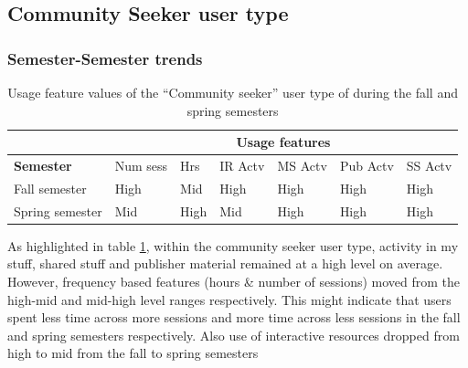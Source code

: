 \documentclass{acm_proc_article-sp}
\begin{document}
\subsection{Community Seeker user type}

\subsubsection{Semester-Semester trends}

\begin{table}
\caption{Usage feature values of the ``Community seeker'' user type of during the fall and  spring semesters}
\label{cluster2semester}
\begin{tabular}{|p{1.5cm}|p{0.6cm}|p{0.6cm}|p{0.6cm}|p{0.6cm}|p{0.8cm}|p{0.8cm}|}
\hline
& \multicolumn{6}{c|}{\textbf{Usage features}}  \\ \hline
 \textbf{Semester} 
 & Num sess & Hrs & IR Actv & MS Actv & Pub Actv & SS Actv \\ \hline
Fall  semester & High & Mid  & High & High & High & High \\ \hline
Spring semester & Mid & High  & Mid & High & High & High \\ \hline
\end{tabular}
\end{table}

As highlighted in table \ref{cluster2semester}, within the community seeker user type, activity in my stuff, shared stuff and publisher material remained at a high level on average. However, frequency based features (hours \& number of sessions) moved from the high-mid and mid-high level ranges respectively. This might indicate that users  spent less time across more sessions and more time across less sessions in the fall and spring semesters respectively. Also use of interactive resources dropped from high to mid from the fall to spring semesters
\end{document}
